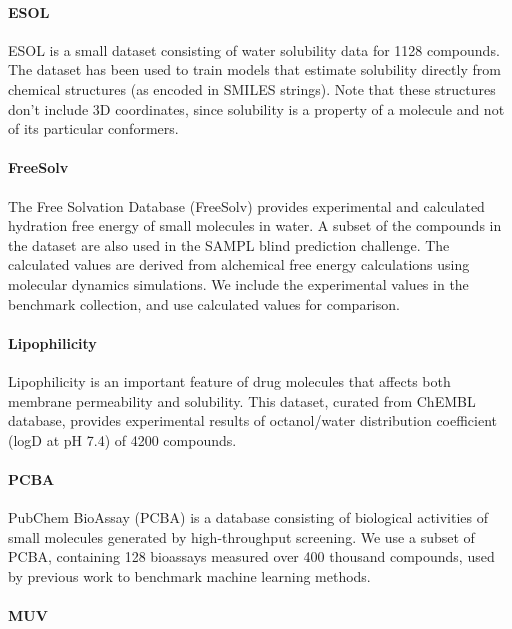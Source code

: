 \paragraph{ESOL}

ESOL is a small dataset consisting of water solubility data for 1128 compounds.\cite{ESOL_dataset} The dataset has been used to train models that estimate solubility directly from chemical structures (as encoded in SMILES strings).\cite{graphconv_feat} Note that these structures don't include 3D coordinates, since solubility is a property of a molecule and not of its particular conformers.

\paragraph{FreeSolv}
The Free Solvation Database (FreeSolv) provides experimental and calculated hydration free energy of small molecules in water\cite{FreeSolv}. A subset of the compounds in the dataset are also used in the SAMPL blind prediction challenge\cite{SAMPL4}. The calculated values are derived from alchemical free energy calculations using molecular dynamics simulations. We include the experimental values in the benchmark collection, and use calculated values for comparison.

\paragraph{Lipophilicity}

Lipophilicity is an important feature of drug molecules that affects both membrane permeability and solubility. This dataset, curated from ChEMBL database,\cite{Hersey2015lipo} provides experimental results of octanol/water distribution coefficient (logD at pH 7.4) of 4200 compounds.

\paragraph{PCBA}

PubChem BioAssay (PCBA) is a database consisting of biological activities of small molecules generated by high-throughput screening.\cite{pcba_dataset} We use a subset of PCBA, containing 128 bioassays measured over 400 thousand compounds, used by previous work to benchmark machine learning methods.\cite{ramsundar2015massively}

\paragraph{MUV}

